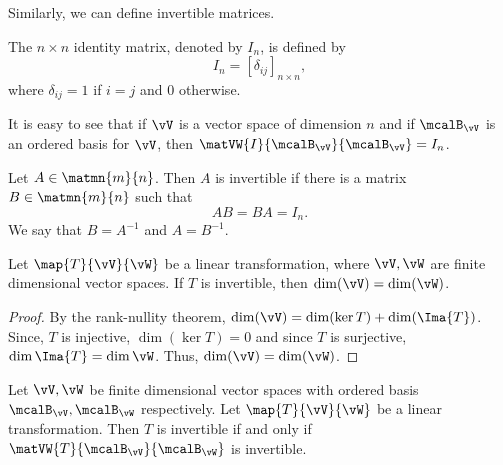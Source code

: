 Similarly, we can define invertible matrices.
\begin{Definition}
    The $n\times n$ identity matrix, denoted by $I_n$, is defined by \[I_n = {[\delta_{ij}]}_{n\times n},\]
    where $\delta_{ij} = 1$ if $i = j$ and $0$ otherwise.
\end{Definition}
\begin{Remark}
    It is easy to see that if $\vV$ is a vector space of dimension $n$ and if $\mcalB_{\vV}$ is an ordered
    basis for $\vV$, then $\matVW{I}{\mcalB_{\vV}}{\mcalB_{\vV}} = I_n$.
\end{Remark}
\begin{Definition}
    Let $A \in \matmn{m}{n}$. Then $A$ is invertible if there is a matrix $B \in \matmn{m}{n}$ such that
    \[AB = BA = I_n.\]
    We say that $B = A^{-1}$ and $A = B^{-1}$.
\end{Definition}
\begin{Proposition}
    Let $\map{T}{\vV}{\vW}$ be a linear transformation, where $\vV,\vW$ are finite dimensional vector spaces.
    If $T$ is invertible, then $\dim(\vV) = \dim(\vW)$.
\end{Proposition}
\begin{proof}
    By the rank-nullity theorem, $\dim(\vV) = \dim(\ker{T}) + \dim(\Ima{T})$. Since, $T$ is injective,
    $\dim(\ker{T}) = 0$ and since $T$ is surjective, $\dim{\Ima{T}} = \dim{\vW}$. Thus,
    $\dim(\vV) = \dim(\vW)$.
\end{proof}
\begin{Theorem}
    Let $\vV,\vW$ be finite dimensional vector spaces with ordered basis $\mcalB_{\vV},\mcalB_{\vW}$
    respectively. Let $\map{T}{\vV}{\vW}$ be a linear transformation. Then $T$ is invertible if and only if
    $\matVW{T}{\mcalB_{\vV}}{\mcalB_{\vW}}$ is invertible.
\end{Theorem}
